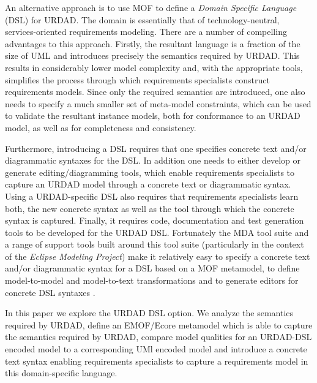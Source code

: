 An alternative approach is to use MOF to define a {\em Domain Specific Language} (DSL) for URDAD. The domain is essentially that of technology-neutral, services-oriented requirements modeling. There are a number of compelling advantages to this approach. Firstly, the resultant language is a fraction of the size of UML and introduces precisely the semantics required by URDAD. This results in considerably lower model complexity and, with the appropriate tools, simplifies the process through which requirements specialists construct requirements models. Since only the required semantics are introduced, one also needs to specify a much smaller set of meta-model constraints, which can be used to validate the resultant instance models, both for conformance to an URDAD model, as well as for completeness and consistency.

Furthermore, introducing a DSL requires that one specifies concrete text and/or diagrammatic syntaxes for the DSL. In addition one needs to either develop or generate editing/diagramming tools, which enable requirements specialists to capture an URDAD model through a concrete text or diagrammatic syntax. Using a URDAD-specific DSL also requires that requirements specialists learn both, the new concrete syntax as well as the tool through which the concrete syntax is captured. Finally, it requires code, documentation and test generation tools to be developed for the URDAD DSL. Fortunately the MDA tool suite and a range of support tools built around this tool suite (particularly in the context of the {\em Eclipse Modeling Project}) make it relatively easy to specify a concrete text and/or diagrammatic syntax for a DSL based on a MOF metamodel, to define model-to-model and model-to-text transformations and to generate editors for concrete DSL syntaxes \cite{gronback_model_2008,}.

In this paper we explore the URDAD DSL option. We analyze the semantics required by URDAD, define an EMOF/Ecore metamodel which is able to capture the semantics required by URDAD, compare model qualities for an URDAD-DSL encoded model to a corresponding UMl encoded model and introduce a concrete text syntax enabling requirements specialists to capture a requirements model in this domain-specific language.

